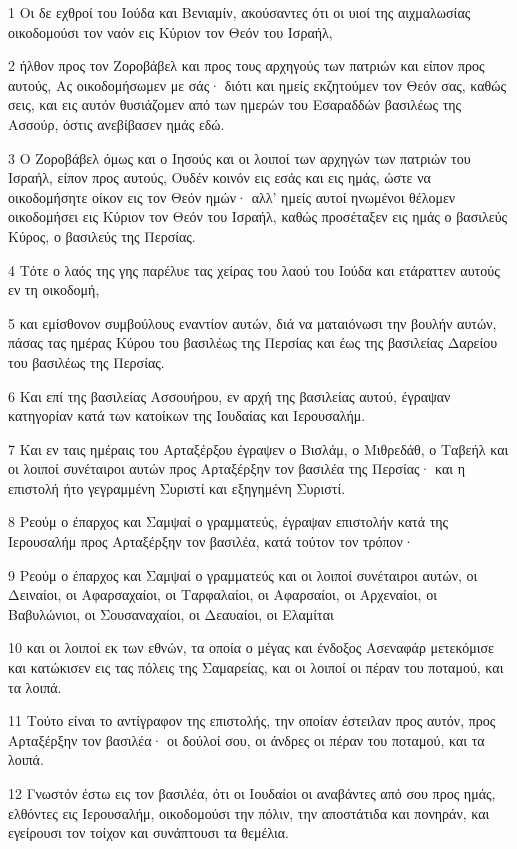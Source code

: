 \par 1 Οι δε εχθροί του Ιούδα και Βενιαμίν, ακούσαντες ότι οι υιοί της αιχμαλωσίας οικοδομούσι τον ναόν εις Κύριον τον Θεόν του Ισραήλ,
\par 2 ήλθον προς τον Ζοροβάβελ και προς τους αρχηγούς των πατριών και είπον προς αυτούς, Ας οικοδομήσωμεν με σάς· διότι και ημείς εκζητούμεν τον Θεόν σας, καθώς σεις, και εις αυτόν θυσιάζομεν από των ημερών του Εσαραδδών βασιλέως της Ασσούρ, όστις ανεβίβασεν ημάς εδώ.
\par 3 Ο Ζοροβάβελ όμως και ο Ιησούς και οι λοιποί των αρχηγών των πατριών του Ισραήλ, είπον προς αυτούς, Ουδέν κοινόν εις εσάς και εις ημάς, ώστε να οικοδομήσητε οίκον εις τον Θεόν ημών· αλλ' ημείς αυτοί ηνωμένοι θέλομεν οικοδομήσει εις Κύριον τον Θεόν του Ισραήλ, καθώς προσέταξεν εις ημάς ο βασιλεύς Κύρος, ο βασιλεύς της Περσίας.
\par 4 Τότε ο λαός της γης παρέλυε τας χείρας του λαού του Ιούδα και ετάραττεν αυτούς εν τη οικοδομή,
\par 5 και εμίσθονον συμβούλους εναντίον αυτών, διά να ματαιόνωσι την βουλήν αυτών, πάσας τας ημέρας Κύρου του βασιλέως της Περσίας και έως της βασιλείας Δαρείου του βασιλέως της Περσίας.
\par 6 Και επί της βασιλείας Ασσουήρου, εν αρχή της βασιλείας αυτού, έγραψαν κατηγορίαν κατά των κατοίκων της Ιουδαίας και Ιερουσαλήμ.
\par 7 Και εν ταις ημέραις του Αρταξέρξου έγραψεν ο Βισλάμ, ο Μιθρεδάθ, ο Ταβεήλ και οι λοιποί συνέταιροι αυτών προς Αρταξέρξην τον βασιλέα της Περσίας· και η επιστολή ήτο γεγραμμένη Συριστί και εξηγημένη Συριστί.
\par 8 Ρεούμ ο έπαρχος και Σαμψαί ο γραμματεύς, έγραψαν επιστολήν κατά της Ιερουσαλήμ προς Αρταξέρξην τον βασιλέα, κατά τούτον τον τρόπον·
\par 9 Ρεούμ ο έπαρχος και Σαμψαί ο γραμματεύς και οι λοιποί συνέταιροι αυτών, οι Δειναίοι, οι Αφαρσαχαίοι, οι Ταρφαλαίοι, οι Αφαρσαίοι, οι Αρχεναίοι, οι Βαβυλώνιοι, οι Σουσαναχαίοι, οι Δεαυαίοι, οι Ελαμίται
\par 10 και οι λοιποί εκ των εθνών, τα οποία ο μέγας και ένδοξος Ασεναφάρ μετεκόμισε και κατώκισεν εις τας πόλεις της Σαμαρείας, και οι λοιποί οι πέραν του ποταμού, και τα λοιπά.
\par 11 Τούτο είναι το αντίγραφον της επιστολής, την οποίαν έστειλαν προς αυτόν, προς Αρταξέρξην τον βασιλέα· οι δούλοί σου, οι άνδρες οι πέραν του ποταμού, και τα λοιπά.
\par 12 Γνωστόν έστω εις τον βασιλέα, ότι οι Ιουδαίοι οι αναβάντες από σου προς ημάς, ελθόντες εις Ιερουσαλήμ, οικοδομούσι την πόλιν, την αποστάτιδα και πονηράν, και εγείρουσι τον τοίχον και συνάπτουσι τα θεμέλια.
